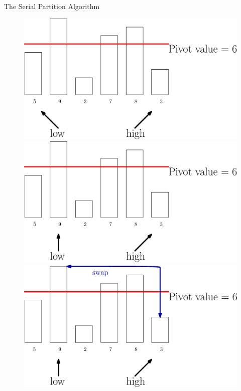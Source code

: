 \documentclass[xcolor=x11names, svgnames, rgb]{beamer}
\begin{document}
\begin{frame}[t]{The Serial Partition Algorithm}
\begin{figure}
		\begin{overprint}
			\includegraphics[width=\linewidth]{imgs/serialPartition/serialPartition1.eps}
		\onslide<2>\includegraphics[width=\linewidth]{imgs/serialPartition/serialPartition2.eps}
		\onslide<3>\includegraphics[width=\linewidth]{imgs/serialPartition/serialPartition3.eps}

\end{overprint}
\end{figure}
\end{frame}
\end{document}
